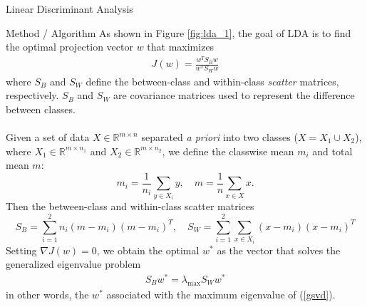 \begin{section}{Linear Discriminant Analysis}
\begin{subsection}{Method / Algorithm}
As shown in Figure \ref{fig:lda_1}, the goal of LDA is to find the optimal projection vector $w$ that maximizes
\begin{align}
	J(w) = \frac{w^T S_B w}{w^T S_W w} \label{objFcn1}
\end{align}
where $S_B$ and $S_W$ define the between-class and within-class \textit{scatter} matrices, respectively. $S_B$ and $S_W$ are covariance matrices used to represent the difference between classes. 
\\
\\
Given a set of data $X \in \mathbb{R}^{m \times n}$ separated \textit{a priori} into two classes ($X = X_1 \cup X_2$), where $X_1 \in \mathbb{R}^{m \times n_1}$ and $X_2 \in \mathbb{R}^{m \times n_2}$, we define the classwise mean $m_i$ and total mean $m$:
$$
	m_i = \frac{1}{n_i} \sum_{y \in X_i} y, \quad m = \frac{1}{n} \sum_{x \in X} x.
$$
Then the between-class and within-class scatter matrices
$$
	S_B = \sum_{i=1}^2 n_i (m - m_i)(m - m_i)^T, \quad
	S_W = \sum_{i=1}^2 \sum_{x \in X_i} (x - m_i)(x - m_i)^T
$$
Setting $\nabla J(w) = 0$, we obtain the optimal $w^*$ as the vector that solves the generalized eigenvalue problem
\begin{align}
	S_B w^* = \lambda_{\text{max}} S_W w^* \label{gsvd}
\end{align}
in other words, the $w^*$ associated with the maximum eigenvalue of (\ref{gsvd}).
\end{subsection}

\end{section}

